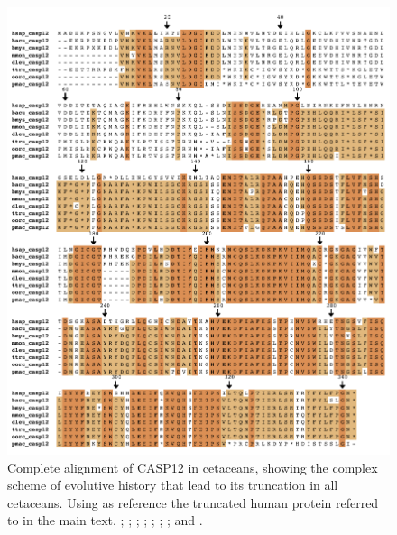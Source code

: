 \begin{figure}
    \begin{center}
        \includegraphics[width=\textwidth]{figures/a_casp12_whole.pdf}
        \caption[Complete alignment of CASP12 in cetaceans]{Complete alignment of CASP12 in cetaceans, showing the complex scheme of evolutive history that lead to its truncation in all cetaceans. Using as reference the truncated human protein referred to in the main text. \hsap; \bacu; \bmys; \mmon; \dleu; \ttru; \oorc; and \pmac.}
        \label{app_f_casp12_align}
    \end{center}
\end{figure}

